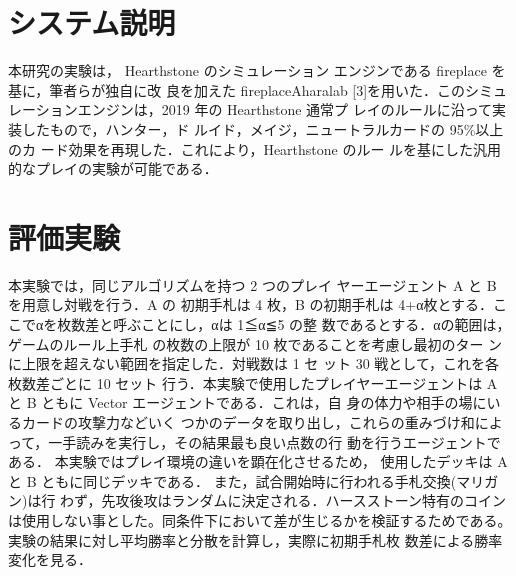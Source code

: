 \documentclass[twocolumn]{ltjsarticle}
\begin{document}
\section{システム説明}
\small{
  本研究の実験は， Hearthstone のシミュレーション
エンジンである fireplace を基に，筆者らが独自に改
良を加えた fireplaceAharalab [3]を用いた．このシミュ
レーションエンジンは，2019 年の Hearthstone 通常プ
レイのルールに沿って実装したもので，ハンター，ド
ルイド，メイジ，ニュートラルカードの 95\%以上のカ
ード効果を再現した．これにより，Hearthstone のルー
ルを基にした汎用的なプレイの実験が可能である．
}
\section{評価実験}
\small{
  本実験では，同じアルゴリズムを持つ 2 つのプレイ
ヤーエージェント A と B を用意し対戦を行う．A の
初期手札は 4 枚，B の初期手札は 4+α枚とする．こ
こでαを枚数差と呼ぶことにし，αは 1≦α≦5 の整
数であるとする．αの範囲は，ゲームのルール上手札
の枚数の上限が 10 枚であることを考慮し最初のター
ンに上限を超えない範囲を指定した．対戦数は 1 セ
ット 30 戦として，これを各枚数差ごとに 10 セット
行う．本実験で使用したプレイヤーエージェントは A
と B ともに Vector エージェントである．これは，自
身の体力や相手の場にいるカードの攻撃力などいく
つかのデータを取り出し，これらの重みづけ和によ
って，一手読みを実行し，その結果最も良い点数の行
動を行うエージェントである．
本実験ではプレイ環境の違いを顕在化させるため，
使用したデッキは A と B ともに同じデッキである．
また，試合開始時に行われる手札交換(マリガン)は行
わず，先攻後攻はランダムに決定される．ハースストーン特有のコインは使用しない事とした。同条件下において差が生じるかを検証するためである。
実験の結果に対し平均勝率と分散を計算し，実際に初期手札枚
数差による勝率変化を見る．
}
\end{document}

